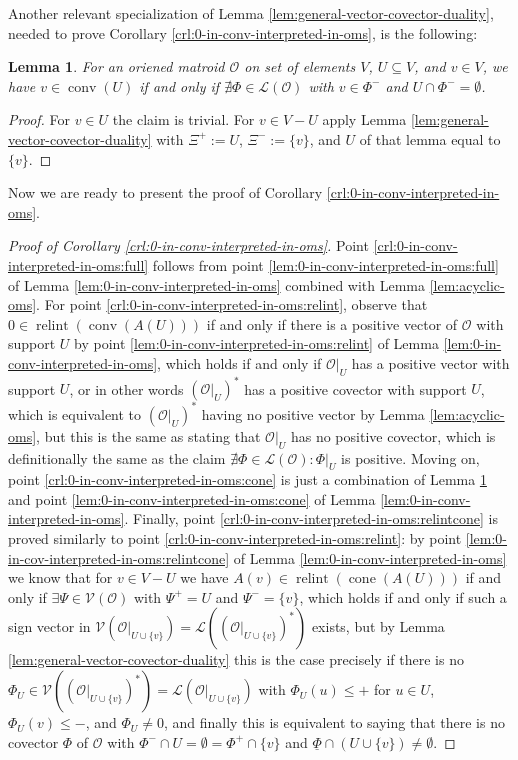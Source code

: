 \documentclass[a4paper,11pt,reqno, english]{amsart}
\newtheorem{lemma}[theorem]{Lemma}
\theoremstyle{definition}
\theoremstyle{remark}
\DeclareMathOperator{\cone}{\mathrm{cone}}
\DeclareMathOperator{\relint}{\mathrm{relint}}
\DeclareMathOperator{\conv}{\mathrm{conv}}
\begin{document}
Another relevant specialization of Lemma \ref{lem:general-vector-covector-duality}, needed to prove Corollary \ref{crl:0-in-conv-interpreted-in-oms}, is the following:
\begin{lemma}\label{lem:cone-as-covectors}
    For an oriened matroid $\mathscr{O}$ on set of elements $V$, $U\subseteq V$, and $v\in V$, we have $v\in\conv(U)$ if and only if $\nexists\Phi\in\mathscr{L}(\mathscr{O})$ with $v\in\Phi^-$ and $U\cap\Phi^-=\emptyset$.
\end{lemma}
\begin{proof}
    For $v\in U$ the claim is trivial. For $v\in V-U$ apply Lemma \ref{lem:general-vector-covector-duality} with $\Xi^+:=U$, $\Xi^-:=\{v\}$, and $U$ of that lemma equal to $\{v\}$.
\end{proof}
Now we are ready to present the proof of Corollary \ref{crl:0-in-conv-interpreted-in-oms}.
\begin{proof}[Proof of Corollary \ref{crl:0-in-conv-interpreted-in-oms}]
    Point \ref{crl:0-in-conv-interpreted-in-oms:full} follows from point \ref{lem:0-in-conv-interpreted-in-oms:full} of Lemma \ref{lem:0-in-conv-interpreted-in-oms} combined with Lemma \ref{lem:acyclic-oms}. For point \ref{crl:0-in-conv-interpreted-in-oms:relint}, observe that $0\in\relint(\conv(A(U)))$ if and only if there is a positive vector of $\mathscr{O}$ with support $U$ by point \ref{lem:0-in-conv-interpreted-in-oms:relint} of Lemma \ref{lem:0-in-conv-interpreted-in-oms}, which holds if and only if $\mathscr{O}|_U$ has a positive vector with support $U$, or in other words $(\mathscr{O}|_U)^*$ has a positive covector with support $U$, which is equivalent to $(\mathscr{O}|_U)^*$ having no positive vector by Lemma \ref{lem:acyclic-oms}, but this is the same as stating that $\mathscr{O}|_U$ has no positive covector, which is definitionally the same as the claim $\nexists\Phi\in\mathscr{L}(\mathscr{O})\colon\Phi|_U$ is positive. Moving on, point \ref{crl:0-in-conv-interpreted-in-oms:cone} is just a combination of Lemma \ref{lem:cone-as-covectors} and point \ref{lem:0-in-conv-interpreted-in-oms:cone} of Lemma \ref{lem:0-in-conv-interpreted-in-oms}. Finally, point \ref{crl:0-in-conv-interpreted-in-oms:relintcone} is proved similarly to point \ref{crl:0-in-conv-interpreted-in-oms:relint}: by point \ref{lem:0-in-cov-interpreted-in-oms:relintcone} of Lemma \ref{lem:0-in-conv-interpreted-in-oms} we know that for $v\in V-U$ we have $A(v)\in\relint(\cone(A(U)))$ if and only if $\exists\Psi\in\mathscr{V}(\mathscr{O})$ with $\Psi^+=U$ and $\Psi^-=\{v\}$, which holds if and only if such a sign vector in $\mathscr{V}(\mathscr{O}|_{U\cup\{v\}})=\mathscr{L}((\mathscr{O}|_{U\cup\{v\}})^*)$ exists, but by Lemma \ref{lem:general-vector-covector-duality} this is the case precisely if there is no $\Phi_U\in\mathscr{V}((\mathscr{O}|_{U\cup\{v\}})^*)=\mathscr{L}(\mathscr{O}|_{U\cup\{v\}})$ with $\Phi_U(u)\leq +$ for $u\in U$, $\Phi_U(v)\leq -$, and $\Phi_U\neq 0$, and finally this is equivalent to saying that there is no covector $\Phi$ of $\mathscr{O}$ with $\Phi^-\cap U=\emptyset=\Phi^+\cap\{v\}$ and $\underline{\Phi}\cap (U\cup\{v\})\neq\emptyset$.
\end{proof}
\end{document}
